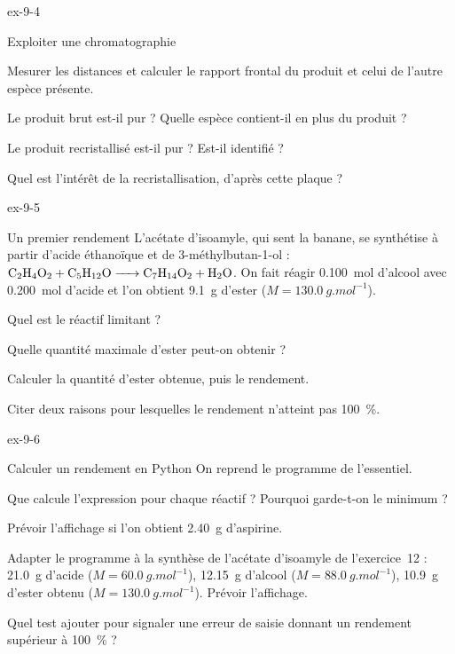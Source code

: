 \begin{blocLivre}{ex-9-4}
\begin{exercice}[1]{Exploiter une chromatographie}
\begin{questions}
\item Mesurer les distances et calculer le rapport frontal du produit et celui de l'autre espèce présente.
\item Le produit brut est-il pur ? Quelle espèce contient-il en plus du produit ?
\item Le produit recristallisé est-il pur ? Est-il identifié ?
\item Quel est l'intérêt de la recristallisation, d'après cette plaque ?
\end{questions}
\end{exercice}
\end{blocLivre}
\begin{blocLivre}{ex-9-5}
\begin{exercice}[1]{Un premier rendement}
L'acétate d'isoamyle, qui sent la banane, se synthétise à partir d'acide éthanoïque et de 3-méthylbutan-1-ol :
$\ce{C2H4O2 + C5H12O -> C7H14O2 + H2O}$. On fait réagir \qty{0,100}{mol} d'alcool avec \qty{0,200}{mol} d'acide et l'on obtient \qty{9,1}{g} d'ester
($M=\qty{130,0}{g.mol^{-1}}$).
\begin{questions}
\item Quel est le réactif limitant ?
\item Quelle quantité maximale d'ester peut-on obtenir ?
\item Calculer la quantité d'ester obtenue, puis le rendement.
\item Citer deux raisons pour lesquelles le rendement n'atteint pas \qty{100}{\percent}.
\end{questions}
\end{exercice}
\end{blocLivre}
\begin{blocLivre}{ex-9-6}
\begin{exercice}[2]{Calculer un rendement en Python}
On reprend le programme de l'essentiel.
\begin{questions}
\item {}Que calcule l'expression  pour chaque réactif ? Pourquoi garde-t-on le minimum ?
\item Prévoir l'affichage si l'on obtient \qty{2,40}{g} d'aspirine.
\item Adapter le programme à la synthèse de l'acétate d'isoamyle de l'exercice~12 : \qty{21,0}{g} d'acide ($M=\qty{60,0}{g.mol^{-1}}$), \qty{12,15}{g}
d'alcool ($M=\qty{88,0}{g.mol^{-1}}$), \qty{10,9}{g} d'ester obtenu ($M=\qty{130,0}{g.mol^{-1}}$). Prévoir l'affichage.
\item Quel test ajouter pour signaler une erreur de saisie donnant un rendement supérieur à \qty{100}{\percent} ?
\end{questions}
\end{exercice}
\end{blocLivre}

